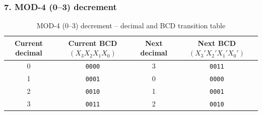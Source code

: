 \documentclass[12pt,letterpaper]{article}
\begin{document}
\subsubsection{7. MOD-4 (0--3) decrement}
\begin{table}[H]\centering
\caption{MOD-4 (0--3) decrement -- decimal and BCD transition table}
\label{tab:kmap-mod4-dec-trans}
\scriptsize
\begin{tabular}{c c c c}\toprule
Current decimal & Current BCD $(X_3X_2X_1X_0)$ & Next decimal & Next BCD $(X_3'X_2'X_1'X_0')$ \\
\midrule
0 & \texttt{0000} & 3 & \texttt{0011} \\
1 & \texttt{0001} & 0 & \texttt{0000} \\
2 & \texttt{0010} & 1 & \texttt{0001} \\
3 & \texttt{0011} & 2 & \texttt{0010} \\
\bottomrule
\end{tabular}
\end{table}
\end{document}
